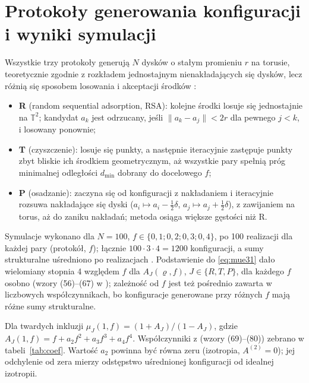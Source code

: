 \documentclass[12pt,a4paper,twoside,openright]{report}
\theoremstyle{definition}
\theoremstyle{remark}
\newcommand{\T}{\mathbb{T}}
\begin{document}
\chapter{Protokoły generowania konfiguracji i wyniki symulacji}\label{sec:sim}

Wszystkie trzy protokoły generują $N$ dysków o stałym promieniu $r$ na torusie, teoretycznie zgodnie z rozkładem jednostajnym nienakładających się dysków, lecz różnią się sposobem losowania i akceptacji środków \cite{czapla2025computational}:
\begin{itemize}[nosep]
\item \textbf{R} (random sequential adsorption, RSA): kolejne środki losuje się jednostajnie na $\T^2$; kandydat $a_k$ jest odrzucany, jeśli $\|a_k-a_j\|<2r$ dla pewnego $j<k$, i losowany ponownie;
\item \textbf{T} (czyszczenie): losuje się punkty, a następnie iteracyjnie zastępuje punkty zbyt bliskie ich środkiem geometrycznym, aż wszystkie pary spełnią próg minimalnej odległości $d_{\min}$ dobrany do docelowego $f$;
\item \textbf{P} (osadzanie): zaczyna się od konfiguracji z nakładaniem i iteracyjnie rozsuwa nakładające się dyski ($a_i\mapsto a_i-\tfrac12\delta$, $a_j\mapsto a_j+\tfrac12\delta$), z zawijaniem na torus, aż do zaniku nakładań; metoda osiąga większe gęstości niż R.
\end{itemize}
Symulacje wykonano dla $N=100$, $f\in\{0{,}1;0{,}2;0{,}3;0{,}4\}$, po 100 realizacji dla każdej pary (protokół, $f$); łącznie $100\cdot3\cdot4=1200$ konfiguracji, a sumy strukturalne uśredniono po realizacjach \cite{czapla2025computational,mityushev2025computationalpart3}. Podstawienie do \eqref{eq:mue31} dało wielomiany stopnia 4 względem $f$ dla $A_J(\varrho,f)$, $J\in\{R,T,P\}$, dla każdego $f$ osobno (wzory (56)--(67) w \cite{czapla2025computational}); zależność od $f$ jest też pośrednio zawarta w liczbowych współczynnikach, bo konfiguracje generowane przy różnych $f$ mają różne sumy strukturalne.

Dla twardych inkluzji $\mu_J(1,f)=(1+A_J)/(1-A_J)$, gdzie $A_J(1,f)=f+a_2f^2+a_3f^3+a_4f^4$. Współczynniki z \cite{czapla2025computational} (wzory (69)--(80)) zebrano w tabeli~\ref{tab:coef}. Wartość $a_2$ powinna być równa zeru (izotropia, $A^{(2)}=0$); jej odchylenie od zera mierzy odstępstwo uśrednionej konfiguracji od idealnej izotropii.
\end{document}
